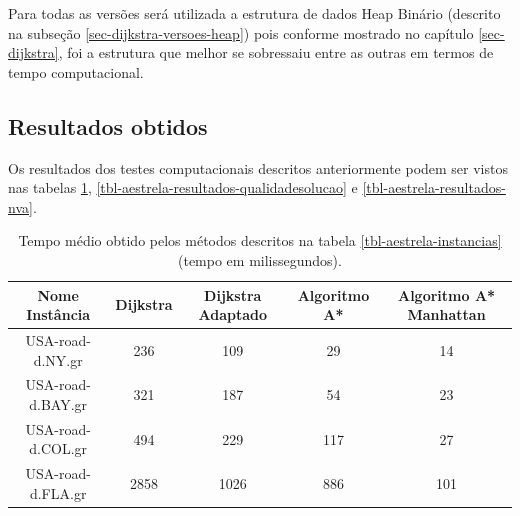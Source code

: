 Para todas as versões será utilizada a estrutura de dados Heap Binário (descrito na subseção \ref{sec-dijkstra-versoes-heap}) pois conforme mostrado no capítulo \ref{sec-dijkstra}, foi a estrutura que melhor se sobressaiu entre as outras em termos de tempo computacional.

\subsection{Resultados obtidos}
\label{sec-aestrela-instancias-resultados}

Os resultados dos testes computacionais descritos anteriormente podem ser vistos nas tabelas \ref{tbl-aestrela-resultados-tempo}, \ref{tbl-aestrela-resultados-qualidadesolucao} e \ref{tbl-aestrela-resultados-nva}.

\begin{table}[H]
\caption{Tempo médio obtido pelos métodos descritos na tabela \ref{tbl-aestrela-instancias} (tempo em milissegundos).}
\label{tbl-aestrela-resultados-tempo}
\centering
\begin{adjustbox}{max width=\textwidth}
\begin{tabular}{|c|c|c|c|c|}
\hline
\textbf{Nome Instância} & \textbf{Dijkstra} & \textbf{Dijkstra Adaptado} & \textbf{Algoritmo A*} & \textbf{Algoritmo A* Manhattan} \\ \hline
USA-road-d.NY.gr        & 236                           & 109                                    & 29                      & 14                                \\ \hline
USA-road-d.BAY.gr       & 321                           & 187                                    & 54                      & 23                                \\ \hline
USA-road-d.COL.gr       & 494                           & 229                                    & 117                     & 27                                \\ \hline
USA-road-d.FLA.gr       & 2858                          & 1026                                   & 886                     & 101                               \\ \hline
\end{tabular} 
\end{adjustbox}
\end{table}

